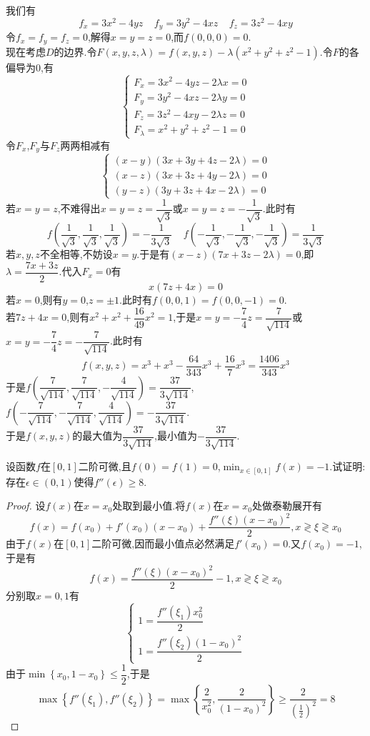 \documentclass{ctexart}
\begin{document}
\begin{solution}
    我们有
    \[f_x=3x^2-4yz\ \ \ \ \ f_y=3y^2-4xz\ \ \ \ \ f_z=3z^2-4xy\]
    令$f_x=f_y=f_z=0$,解得$x=y=z=0$,而$f(0,0,0)=0$.\\
    现在考虑$D$的边界.令$F(x,y,z,\lambda)=f(x,y,z)-\lambda(x^2+y^2+z^2-1)$.令$F$的各偏导为$0$,有
    \[\left\{\begin{array}{l}
        F_x=3x^2-4yz-2\lambda x=0\\
        F_y=3y^2-4xz-2\lambda y=0\\
        F_z=3z^2-4xy-2\lambda z=0\\
        F_\lambda=x^2+y^2+z^2-1=0
    \end{array}\right.\]
    令$F_x$,$F_y$与$F_z$两两相减有
    \[\left\{\begin{array}{l}
        (x-y)(3x+3y+4z-2\lambda)=0\\
        (x-z)(3x+3z+4y-2\lambda)=0\\
        (y-z)(3y+3z+4x-2\lambda)=0
    \end{array}\right.\]
    若$x=y=z$,不难得出$x=y=z=\dfrac{1}{\sqrt3}$或$x=y=z=-\dfrac{1}{\sqrt3}$.此时有
    \[f\left(\dfrac{1}{\sqrt3},\dfrac{1}{\sqrt3},\dfrac{1}{\sqrt3}\right)=-\dfrac{1}{3\sqrt3}\ \ \ \ \ f\left(-\dfrac{1}{\sqrt3},-\dfrac{1}{\sqrt3},-\dfrac{1}{\sqrt3}\right)=\dfrac{1}{3\sqrt3}\]
    若$x,y,z$不全相等,不妨设$x=y$.于是有$(x-z)(7x+3z-2\lambda)=0$,即$\lambda=\dfrac{7x+3z}{2}$.代入$F_x=0$有
    \[x(7z+4x)=0\]
    若$x=0$,则有$y=0$,$z=\pm1$.此时有$f(0,0,1)=f(0,0,-1)=0$.\\
    若$7z+4x=0$,则有$x^2+x^2+\dfrac{16}{49}x^2=1$,于是$x=y=-\dfrac74z=\dfrac{7}{\sqrt{114}}$或$x=y=-\dfrac74z=-\dfrac{7}{\sqrt{114}}$.此时有
    \[f(x,y,z)=x^3+x^3-\dfrac{64}{343}x^3+\dfrac{16}{7}x^3=\dfrac{1406}{343}x^3\]
    于是$f\left(\dfrac{7}{\sqrt{114}},\dfrac{7}{\sqrt{114}},-\dfrac{4}{\sqrt{114}}\right)=\dfrac{37}{3\sqrt{114}}$,$f\left(-\dfrac{7}{\sqrt{114}},-\dfrac{7}{\sqrt{114}},\dfrac{4}{\sqrt{114}}\right)=-\dfrac{37}{3\sqrt{114}}$.\\
    于是$f(x,y,z)$的最大值为$\dfrac{37}{3\sqrt{114}}$,最小值为$-\dfrac{37}{3\sqrt{114}}$.
\end{solution}
\begin{problem}[9.(10\songti{分})]
    设函数$f$在$[0,1]$二阶可微,且$f(0)=f(1)=0$,$\displaystyle\min_{x\in[0,1]}f(x)=-1$.试证明:存在$\epsilon\in(0,1)$使得$f''(\epsilon)\geqslant8$.
\end{problem}
\begin{proof}
    设$f(x)$在$x=x_0$处取到最小值.将$f(x)$在$x=x_0$处做泰勒展开有
    \[f(x)=f(x_0)+f'(x_0)(x-x_0)+\dfrac{f''(\xi)(x-x_0)^2}{2},x\gtrless\xi\gtrless x_0\]
    由于$f(x)$在$[0,1]$二阶可微,因而最小值点必然满足$f'(x_0)=0$.又$f(x_0)=-1$,于是有
    \[f(x)=\dfrac{f''(\xi)(x-x_0)^2}{2}-1,x\gtrless\xi\gtrless x_0\]
    分别取$x=0,1$有
    \[\left\{\begin{array}{l}
        1=\dfrac{f''(\xi_1)x_0^2}{2}\\
        1=\dfrac{f''(\xi_2)(1-x_0)^2}{2}
    \end{array}\right.\]
    由于$\min\left\{x_0,1-x_0\right\}\leqslant\dfrac12$,于是
    \[\max\left\{f''(\xi_1),f''(\xi_2)\right\}=\max\left\{\dfrac{2}{x_0^2},\dfrac{2}{(1-x_0)^2}\right\}\geqslant\dfrac{2}{\left(\frac12\right)^2}=8\]
\end{proof}
\end{document}

